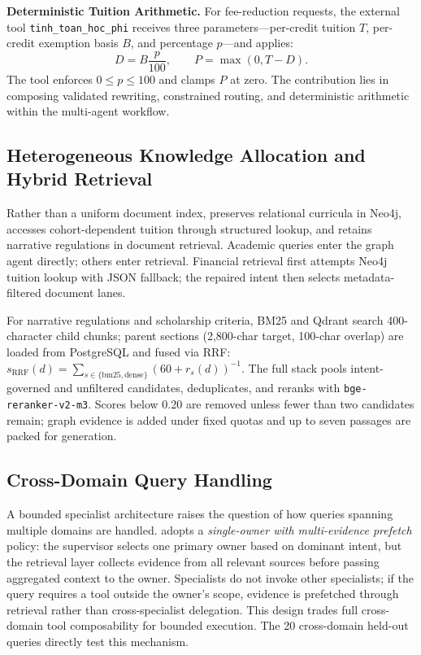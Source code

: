 \textbf{Deterministic Tuition Arithmetic.}
For fee-reduction requests, the external tool \texttt{tinh\_toan\_hoc\_phi} receives three parameters---per-credit tuition $T$, per-credit exemption basis $B$, and percentage $p$---and applies:
\begin{equation}
  D = B\frac{p}{100}, \qquad P = \max(0, T-D).
  \label{eq:tuition_reduction}
\end{equation}
The tool enforces $0 \le p \le 100$ and clamps $P$ at zero. The contribution lies in composing validated rewriting, constrained routing, and deterministic arithmetic within the multi-agent workflow.

\subsection{Heterogeneous Knowledge Allocation and Hybrid Retrieval}
\label{sec:hybrid_retrieval}

Rather than a uniform document index, \system{} preserves relational curricula in Neo4j, accesses cohort-dependent tuition through structured lookup, and retains narrative regulations in document retrieval. Academic queries enter the graph agent directly; others enter retrieval. Financial retrieval first attempts Neo4j tuition lookup with JSON fallback; the repaired intent then selects metadata-filtered document lanes.

For narrative regulations and scholarship criteria, BM25 and Qdrant search 400-character child chunks; parent sections (2,800-char target, 100-char overlap) are loaded from PostgreSQL and fused via RRF: $s_{\mathrm{RRF}}(d)=\sum_{s\in\{\mathrm{bm25},\mathrm{dense}\}}(60+r_s(d))^{-1}$. The full stack pools intent-governed and unfiltered candidates, deduplicates, and reranks with \texttt{bge-reranker-v2-m3}. Scores below 0.20 are removed unless fewer than two candidates remain; graph evidence is added under fixed quotas and up to seven passages are packed for generation.

\subsection{Cross-Domain Query Handling}
\label{sec:cross_domain}

A bounded specialist architecture raises the question of how queries spanning multiple domains are handled. \system{} adopts a \emph{single-owner with multi-evidence prefetch} policy: the supervisor selects one primary owner based on dominant intent, but the retrieval layer collects evidence from all relevant sources before passing aggregated context to the owner. Specialists do not invoke other specialists; if the query requires a tool outside the owner's scope, evidence is prefetched through retrieval rather than cross-specialist delegation. This design trades full cross-domain tool composability for bounded execution. The 20 cross-domain held-out queries directly test this mechanism.
